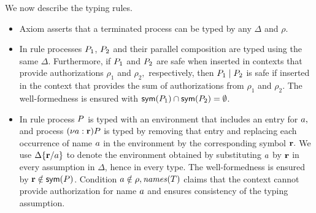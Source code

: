 We now describe the typing rules.
\begin{itemize}
\item Axiom  asserts that a terminated process can be typed by any $\Delta$ and $\rho$.
\item In rule  processes $P_1$, $P_2$ and their  parallel composition are typed using the same $\Delta$. %
Furthermore, if $P_1$ and $P_2$ are safe when inserted in contexts that provide authorizations $\rho_1$ and $\rho_2,$ respectively, then $P_1 \;|\; P_2$ is safe if inserted in the context that provides the sum of authorizations from $\rho_1$ and $\rho_2$. 
The well-formedness is ensured with $\mathsf{sym}(P_1)\cap\mathsf{sym}(P_2)=\emptyset$.

\item In rule  process $P$ is typed with an environment that includes an entry for $a,$ and process
$(\nu a: {\mathbf{r}})P$ is typed by removing that entry and replacing each occurrence of name $a$ in the environment by the corresponding symbol ${\mathbf{r}}.$
We use $\Delta\{{\mathbf{r}}/a\}$ to denote the environment obtained by substituting $a$ by ${\mathbf{r}}$ in every assumption in $\Delta$, hence in every type. %
The well-formedness is ensured by ${\mathbf{r}}\notin\mathsf{sym}(P)$. Condition $a\notin\rho, \mathit{names}(T)$ claims that the context cannot provide authorization for name $a$ and ensures consistency of the typing assumption.
 

\end{itemize}

